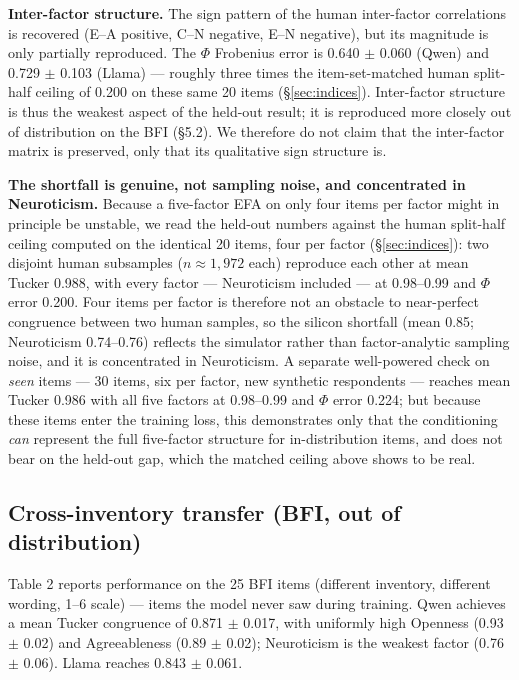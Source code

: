 \documentclass[11pt]{article}
\begin{document}
\textbf{Inter-factor structure.} The sign pattern of the human inter-factor correlations is recovered (E–A positive, C–N negative, E–N negative), but its magnitude is only partially reproduced. The $\Phi$ Frobenius error is 0.640 $\pm$ 0.060 (Qwen) and 0.729 $\pm$ 0.103 (Llama) — roughly three times the item-set-matched human split-half ceiling of 0.200 on these same 20 items (\S\ref{sec:indices}). Inter-factor structure is thus the weakest aspect of the held-out result; it is reproduced more closely out of distribution on the BFI (\S{}5.2). We therefore do not claim that the inter-factor matrix is preserved, only that its qualitative sign structure is.

\textbf{The shortfall is genuine, not sampling noise, and concentrated in Neuroticism.} Because a five-factor EFA on only four items per factor might in principle be unstable, we read the held-out numbers against the human split-half ceiling computed on the identical 20 items, four per factor (\S\ref{sec:indices}): two disjoint human subsamples ($n \approx 1{,}972$ each) reproduce each other at mean Tucker 0.988, with every factor — Neuroticism included — at 0.98–0.99 and $\Phi$ error 0.200. Four items per factor is therefore not an obstacle to near-perfect congruence between two human samples, so the silicon shortfall (mean 0.85; Neuroticism 0.74–0.76) reflects the simulator rather than factor-analytic sampling noise, and it is concentrated in Neuroticism. A separate well-powered check on \emph{seen} items — 30 items, six per factor, new synthetic respondents — reaches mean Tucker 0.986 with all five factors at 0.98–0.99 and $\Phi$ error 0.224; but because these items enter the training loss, this demonstrates only that the conditioning \emph{can} represent the full five-factor structure for in-distribution items, and does not bear on the held-out gap, which the matched ceiling above shows to be real.

\subsection{Cross-inventory transfer (BFI, out of distribution)}

Table 2 reports performance on the 25 BFI items (different inventory, different wording, 1–6 scale) — items the model never saw during training. Qwen achieves a mean Tucker congruence of 0.871 $\pm$ 0.017, with uniformly high Openness (0.93 $\pm$ 0.02) and Agreeableness (0.89 $\pm$ 0.02); Neuroticism is the weakest factor (0.76 $\pm$ 0.06). Llama reaches 0.843 $\pm$ 0.061.
\end{document}
